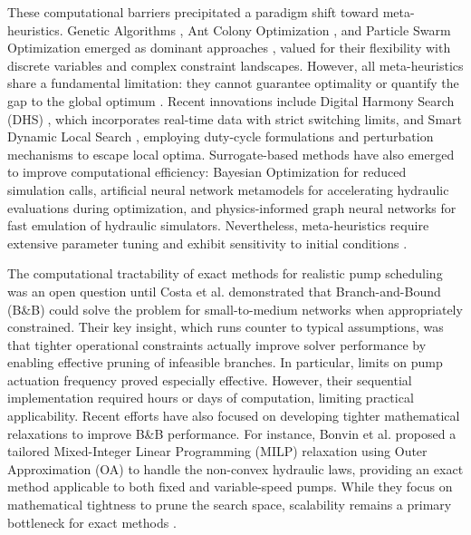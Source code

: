 \documentclass[a4paper,fleqn]{cas-dc}
\begin{document}
These computational barriers precipitated a paradigm shift toward meta-heuristics. Genetic Algorithms \cite{Savic1997,Mackle1995}, Ant Colony Optimization \cite{LpezIbez2008}, and Particle Swarm Optimization \cite{AlAni2012} emerged as dominant approaches \cite{Reis2023}, valued for their flexibility with discrete variables and complex constraint landscapes. However, all meta-heuristics share a fundamental limitation: they cannot guarantee optimality or quantify the gap to the global optimum \cite{Costa2016,Reis2023}. Recent innovations include Digital Harmony Search (DHS) \cite{Paola2024}, which incorporates real-time data with strict switching limits, and Smart Dynamic Local Search \cite{Bras2025}, employing duty-cycle formulations and perturbation mechanisms to escape local optima. Surrogate-based methods have also emerged to improve computational efficiency: Bayesian Optimization \cite{Candelieri2018,Bagloee2018} for reduced simulation calls, artificial neural network metamodels \cite{Broad2010,Rao2007} for accelerating hydraulic evaluations during optimization, and physics-informed graph neural networks \cite{Ashraf2024} for fast emulation of hydraulic simulators. Nevertheless, meta-heuristics require extensive parameter tuning and exhibit sensitivity to initial conditions \cite{Reis2023}.

The computational tractability of exact methods for realistic pump scheduling was an open question until Costa et al. \cite{Costa2016} demonstrated that Branch-and-Bound (B\&B) \cite{Land1960} could solve the problem for small-to-medium networks when appropriately constrained. Their key insight, which runs counter to typical assumptions, was that tighter operational constraints actually improve solver performance by enabling effective pruning of infeasible branches. In particular, limits on pump actuation frequency proved especially effective. However, their sequential implementation required hours or days of computation, limiting practical applicability. Recent efforts have also focused on developing tighter mathematical relaxations to improve B\&B performance. For instance, Bonvin et al. \cite{Bonvin2021} proposed a tailored Mixed-Integer Linear Programming (MILP) relaxation using Outer Approximation (OA) to handle the non-convex hydraulic laws, providing an exact method applicable to both fixed and variable-speed pumps. While they focus on mathematical tightness to prune the search space, scalability remains a primary bottleneck for exact methods \cite{Reis2023,MalaJetmarova2018}.
\end{document}
